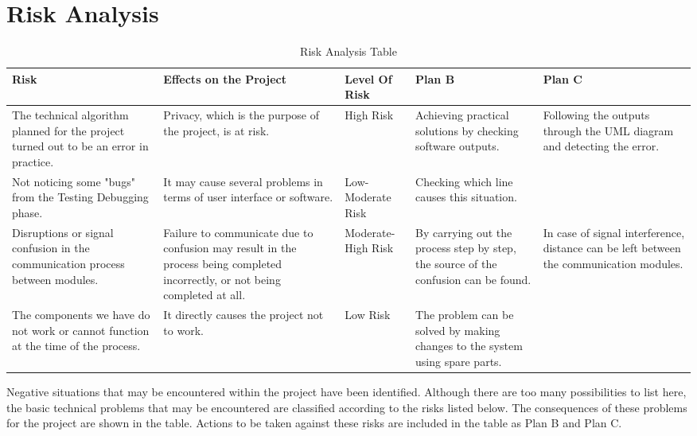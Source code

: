 \documentclass[12pt]{article}
\begin{document}
 	\section{Risk Analysis}
 	 	\centering
 	\begin{table}[H]
 	\centering
	\renewcommand{\arraystretch}{0.2}
	
 		\begin{longtable}{|p{3cm}|p{3cm}|p{1.6cm}|p{2cm}|p{2cm}|}
 			\hline
 			Risk  & Effects on the Project  & Level Of Risk  & Plan B & Plan C  \\
 			\hline
 		\endfirsthead
 	
 			The technical algorithm planned for the project turned out to be an error in practice.  & Privacy, which is the purpose of the project, is at risk.  & High Risk  & Achieving practical solutions by checking software outputs. & Following the outputs through the UML diagram and detecting the error.  \\	\hline
 			Not noticing some "bugs" from the Testing Debugging phase.  & It may cause several problems in terms of user interface or software.  & Low-Moderate Risk  & Checking which line causes this situation. &   \\	\hline
 			Disruptions or signal confusion in the communication process between modules.  & Failure to communicate due to confusion may result in the process being completed incorrectly, or not being completed at all.  & Moderate-High Risk& By carrying out the process step by step, the source of the confusion can be found.  & In case of signal interference, distance can be left between the communication modules.  \\	\hline
 			The components we have do not work or cannot function at the time of the process. & It directly causes the project not to work.  & Low Risk  & The problem can be solved by making changes to the system using spare parts.  &   \\
 			\hline
 		
 		
 		
 	
 		\end{longtable}
 		\caption{Risk Analysis Table}
 	\end{table}
 Negative situations that may be encountered within the project have been identified. Although there are too many possibilities to list here, the basic technical problems that may be encountered are classified according to the risks listed below. The consequences of these problems for the project are shown in the table. Actions to be taken against these risks are included in the table as Plan B and Plan C. 
 	\newpage
\end{document}
